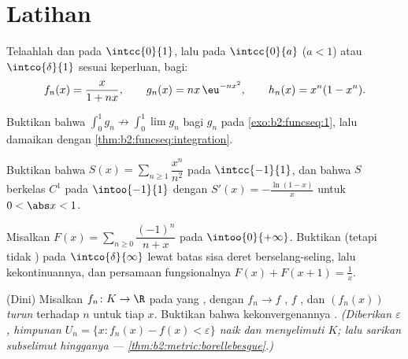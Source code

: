 \section{Latihan}

\begin{exercise}[$\star$]\label{exo:b2:funcseq:1}
Telaahlah  dan 
pada $\intcc{0}{1}$, lalu pada $\intcc{0}{a}$ ($a < 1$) atau
$\intco{\delta}{1}$ sesuai keperluan, bagi:
\[
f_n(x) = \frac{x}{1 + nx},
\qquad
g_n(x) = n x\,\eu^{-n x^2},
\qquad
h_n(x) = x^n(1 - x^n).
\]
\end{exercise}

\begin{exercise}[$\star$]\label{exo:b2:funcseq:2}
Buktikan bahwa $\displaystyle\int_0^1 g_n \not\to \int_0^1 \lim g_n$
bagi $g_n$ pada \cref{exo:b2:funcseq:1}, lalu damaikan dengan
\cref{thm:b2:funcseq:integration}.
\end{exercise}

\begin{exercise}[$\star$]\label{exo:b2:funcseq:3}
Buktikan bahwa $S(x) = \sum_{n\geq1} \dfrac{x^n}{n^2}$  pada
$\intcc{-1}{1}$, dan bahwa $S$ berkelas $C^1$ pada $\intoo{-1}{1}$ dengan
$S'(x) = -\frac{\ln(1-x)}{x}$ untuk $0 < \abs x < 1$.
\end{exercise}

\begin{exercise}[$\star\star$]\label{exo:b2:funcseq:4}
Misalkan $F(x) = \sum_{n \geq 0} \dfrac{(-1)^n}{n + x}$ pada
$\intoo{0}{+\infty}$. Buktikan  (tetapi tidak
) pada $\intco{\delta}{\infty}$ lewat batas sisa deret
berselang-seling, lalu kekontinuannya, dan persamaan fungsionalnya $F(x)
+ F(x + 1) = \frac1x$.
\end{exercise}

\begin{exercise}[$\star\star$]\label{exo:b2:funcseq:5}
(Dini) Misalkan $f_n \colon K \to \R$  pada  yang
\emph{}, dengan $f_n \to f$ \emph{}, $f$ ,
dan $(f_n(x))$ \emph{turun} terhadap $n$ untuk tiap $x$. Buktikan bahwa
kekonvergenannya . \emph{(Diberikan $\varepsilon$, himpunan
 $U_n = \{x : f_n(x) - f(x) < \varepsilon\}$ naik dan menyelimuti
$K$; lalu sarikan subselimut hingganya ---
\cref{thm:b2:metric:borellebesgue}.)}
\end{exercise}

